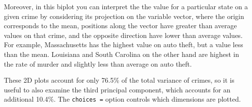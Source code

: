 \documentclass[
  letterpaper,
  10pt,
  krantz2]{krantz}
\makeatletter
\newenvironment{Shaded}{\begin{snugshade}}{\end{snugshade}}
\newcommand{\AttributeTok}[1]{\textcolor[rgb]{0.40,0.45,0.13}{#1}}
\newcommand{\ConstantTok}[1]{\textcolor[rgb]{0.56,0.35,0.01}{#1}}
\newcommand{\DecValTok}[1]{\textcolor[rgb]{0.68,0.00,0.00}{#1}}
\newcommand{\FloatTok}[1]{\textcolor[rgb]{0.68,0.00,0.00}{#1}}
\newcommand{\FunctionTok}[1]{\textcolor[rgb]{0.28,0.35,0.67}{#1}}
\newcommand{\NormalTok}[1]{\textcolor[rgb]{0.00,0.23,0.31}{#1}}
\newcommand{\SpecialCharTok}[1]{\textcolor[rgb]{0.37,0.37,0.37}{#1}}
\newcommand{\StringTok}[1]{\textcolor[rgb]{0.13,0.47,0.30}{#1}}
\newenvironment{kframe}{%
  \medskip{}
  \setlength{\fboxsep}{.8em}
  \def\at@end@of@kframe{}%
  \ifinner\ifhmode%
  \def\at@end@of@kframe{\end{minipage}}%
  \begin{minipage}{\columnwidth}%
  \fi\fi%
  \def\FrameCommand##1{\hskip\@totalleftmargin \hskip-\fboxsep
  \colorbox{shadecolor}{##1}\hskip-\fboxsep
      \hskip-\linewidth \hskip-\@totalleftmargin \hskip\columnwidth}%
  \MakeFramed {\advance\hsize-\width
    \@totalleftmargin\z@ \linewidth\hsize
    \@setminipage}}%
{\par\unskip\endMakeFramed%
  \at@end@of@kframe}
\renewenvironment{Shaded}{\begin{kframe}}{\end{kframe}}
\makeatother
\begin{document}
Moreover, in this biplot you can interpret the the value for a
particular state on a given crime by considering its projection on the
variable vector, where the origin corresponds to the mean, positions
along the vector have greater than average values on that crime, and the
opposite direction have lower than average values. For example,
Massachusetts has the highest value on auto theft, but a value less than
the mean. Louisiana and South Carolina on the other hand are highest in
the rate of murder and slightly less than average on auto theft.

These 2D plots account for only 76.5\% of the total variance of crimes,
so it is useful to also examine the third principal component, which
accounts for an additional 10.4\%. The \texttt{choices\ =} option
controls which dimensions are plotted.

\begin{Shaded}
\end{Shaded}
\end{document}

